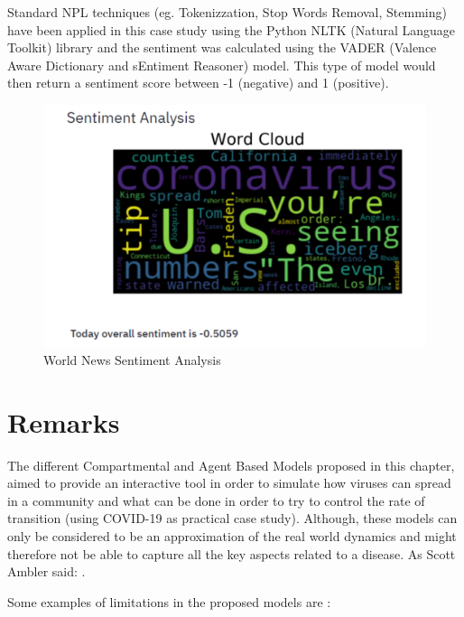 Standard NPL techniques (eg. Tokenizzation, Stop Words Removal, Stemming) have been applied in this case study using the Python NLTK (Natural Language Toolkit) library and the sentiment was calculated using the VADER (Valence Aware Dictionary and sEntiment Reasoner) model. This type of model would then return a sentiment score between -1 (negative) and 1 (positive).

\begin{figure}[ht!]%
    \centering
    \includegraphics[width=0.8\linewidth]{latex/images/news2.pdf}
    \caption{World News Sentiment Analysis}
    \label{news2}
\end{figure}

\section{Remarks}
The different Compartmental and Agent Based Models proposed in this chapter, aimed to provide an interactive tool in order to simulate how viruses can spread in a community and what can be done in order to try to control the rate of transition (using COVID-19 as practical case study). Although, these models can only be considered to be an approximation of the real world dynamics and might therefore not be able to capture all the key aspects related to a disease. As Scott Ambler \cite{scott} said: .

Some examples of limitations in the proposed models are \cite{sri_ex}:

